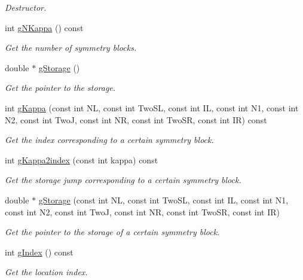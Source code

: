 \begin{DoxyCompactItemize}
\begin{DoxyCompactList}\small\item\em Destructor. \end{DoxyCompactList}\item 
int \hyperlink{classCheMPS2_1_1Sobject_a1dfbe469443fbf7daa49c1d0cb34425e}{g\-N\-Kappa} () const 
\begin{DoxyCompactList}\small\item\em Get the number of symmetry blocks. \end{DoxyCompactList}\item 
double $\ast$ \hyperlink{classCheMPS2_1_1Sobject_a55a31306f564c1d220d36ac9a07623c9}{g\-Storage} ()
\begin{DoxyCompactList}\small\item\em Get the pointer to the storage. \end{DoxyCompactList}\item 
int \hyperlink{classCheMPS2_1_1Sobject_a5626b98bd01a9fb04f4d8e9e739e3034}{g\-Kappa} (const int N\-L, const int Two\-S\-L, const int I\-L, const int N1, const int N2, const int Two\-J, const int N\-R, const int Two\-S\-R, const int I\-R) const 
\begin{DoxyCompactList}\small\item\em Get the index corresponding to a certain symmetry block. \end{DoxyCompactList}\item 
int \hyperlink{classCheMPS2_1_1Sobject_aff81bb404f07da2814b396306fb38588}{g\-Kappa2index} (const int kappa) const 
\begin{DoxyCompactList}\small\item\em Get the storage jump corresponding to a certain symmetry block. \end{DoxyCompactList}\item 
double $\ast$ \hyperlink{classCheMPS2_1_1Sobject_a5a20b20dd98d6ebb67936c525dad5dfc}{g\-Storage} (const int N\-L, const int Two\-S\-L, const int I\-L, const int N1, const int N2, const int Two\-J, const int N\-R, const int Two\-S\-R, const int I\-R)
\begin{DoxyCompactList}\small\item\em Get the pointer to the storage of a certain symmetry block. \end{DoxyCompactList}\item 
int \hyperlink{classCheMPS2_1_1Sobject_a973aa40f2b0e659a55b4c63e768afdf2}{g\-Index} () const 
\begin{DoxyCompactList}\small\item\em Get the location index. \end{DoxyCompactList}\item 

\end{DoxyCompactItemize}
